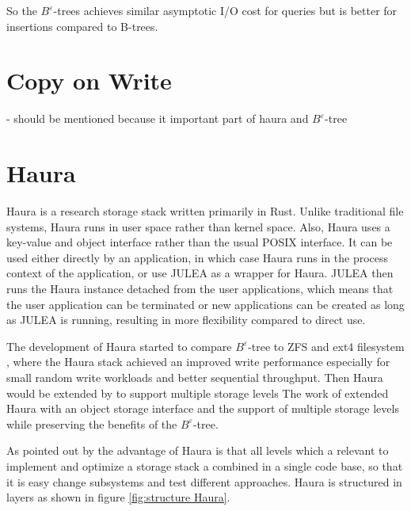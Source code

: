 \documentclass[
	12pt,
	a4paper,
	abstract,
	bibliography=totoc,
	chapterprefix,
	headings=openright,
	numbers=endperiod,
	parskip=half,
	twoside,
]{scrreprt}
\begin{document}
So the $B^{\varepsilon}$-trees achieves similar asymptotic I/O cost for queries but is better for insertions compared to B-trees.

\section{Copy on Write}
\label{sec:copy on write}

- should be mentioned because it important part of haura and $B^{\varepsilon}$-tree

\section{Haura}
\label{sec:haura}

Haura is a research storage stack written primarily in Rust.
Unlike traditional file systems, Haura runs in user space rather than kernel space.
Also, Haura uses a key-value and object interface rather than the usual POSIX interface.
It can be used either directly by an application, in which case Haura runs in the process context of the application, or
use JULEA as a wrapper for Haura.
JULEA then runs the Haura instance detached from the user applications, which means that the user application can be terminated or new applications can be created as long as JULEA is running, resulting in more flexibility compared to direct use.


The development of Haura started to compare $B^{\varepsilon}$-tree to ZFS and ext4 filesystem \cite{wiedemann2018modern}, where the Haura stack
achieved an improved write performance especially for small random write workloads and better sequential throughput.
Then Haura would be extended by \cite{hoppner2021design} to support multiple storage levels
The work of \cite{hoppner2021design} extended Haura with an object storage interface and the support of multiple storage levels while preserving the benefits of the $B^{\varepsilon}$-tree.

As pointed out by \cite{wunsche2022data} the advantage of Haura is that all levels which a relevant to implement and optimize a storage stack a combined in a single code base, so that it is easy change subsystems and test different approaches.
Haura is structured in layers as shown in figure \ref{fig:structure Haura}.
\end{document}
